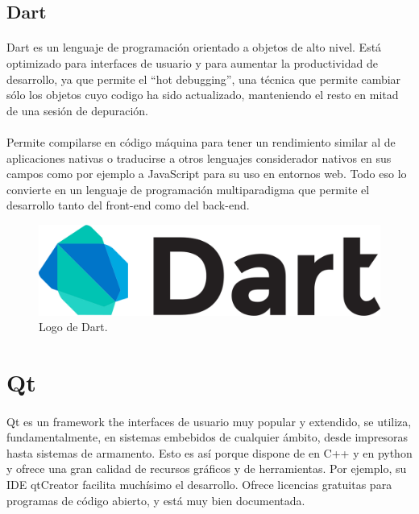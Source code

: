 \subsection{Dart}\label{sec:dart}

\paragraph{}Dart es un lenguaje de programación orientado a objetos de alto nivel.
Está optimizado para interfaces de usuario y para aumentar la productividad de desarrollo,
ya que permite el ``hot debugging'', una técnica que permite cambiar sólo los objetos cuyo
codigo ha sido actualizado, manteniendo el resto en mitad de una sesión de depuración.
\cite{dart}

\paragraph{}Permite compilarse en código máquina para tener un rendimiento similar al
de aplicaciones nativas o traducirse a otros lenguajes considerador nativos en sus campos
como por ejemplo a JavaScript para su uso en entornos web. Todo eso lo convierte en un
lenguaje de programación multiparadigma que permite el desarrollo tanto del \gls{front-end}
como del \gls{back-end}.

\begin{figure}[H]
	\centering
	\includegraphics[width=0.50\linewidth]{imgs/dart-logo}
	\caption[Dart Logo]{Logo de Dart.}
	\label{fig:dart}
\end{figure}

\section{Qt}\label{sec:Qt}

\paragraph{}Qt es un \gls{framework} the interfaces de usuario muy popular y extendido,
se utiliza, fundamentalmente, en sistemas embebidos de cualquier ámbito, desde impresoras
hasta sistemas de armamento. Esto es así porque dispone de  en C++ y en
python y ofrece una gran calidad de recursos gráficos y de herramientas. Por ejemplo,
su \gls{IDE} qtCreator facilita muchísimo el desarrollo. Ofrece licencias gratuitas para
programas de código abierto, y está muy bien documentada.

